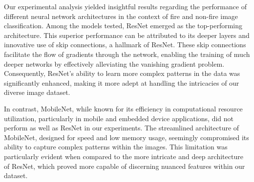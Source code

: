 \begin{center}
\end{center}

Our experimental analysis yielded insightful results regarding the performance of different neural network architectures in the context of fire and non-fire image classification. Among the models tested, ResNet emerged as the top-performing architecture. This superior performance can be attributed to its deeper layers and innovative use of skip connections, a hallmark of ResNet. These skip connections facilitate the flow of gradients through the network, enabling the training of much deeper networks by effectively alleviating the vanishing gradient problem. Consequently, ResNet's ability to learn more complex patterns in the data was significantly enhanced, making it more adept at handling the intricacies of our diverse image dataset.

In contrast, MobileNet, while known for its efficiency in computational resource utilization, particularly in mobile and embedded device applications, did not perform as well as ResNet in our experiments. The streamlined architecture of MobileNet, designed for speed and low memory usage, seemingly compromised its ability to capture complex patterns within the images. This limitation was particularly evident when compared to the more intricate and deep architecture of ResNet, which proved more capable of discerning nuanced features within our dataset.

